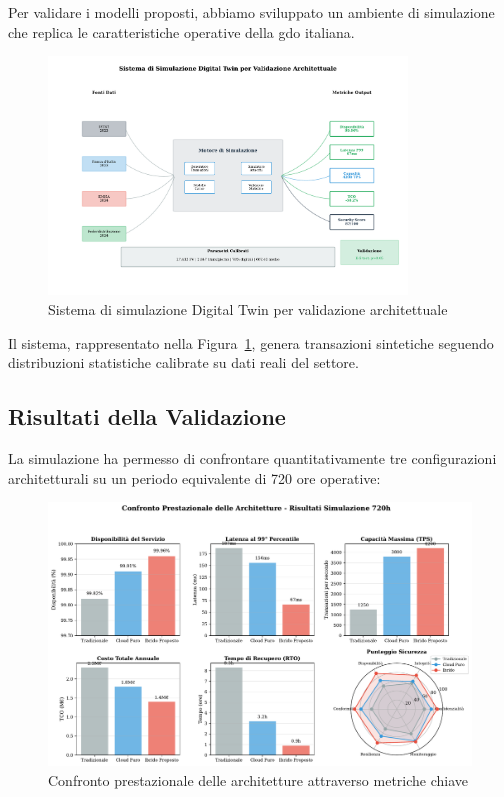 Per validare i modelli proposti, abbiamo sviluppato un ambiente di simulazione che replica le caratteristiche operative della \gls{gdo} italiana.

\begin{figure}[htbp]
\centering
\includegraphics[width=0.85\textwidth]{thesis_figures/cap4/fig_3_4_simulation_system.pdf}
\caption{Sistema di simulazione Digital Twin per validazione architettuale}
\label{fig:simulation-system}
\end{figure}

Il sistema, rappresentato nella Figura~\ref{fig:simulation-system}, genera transazioni sintetiche seguendo distribuzioni statistiche calibrate su dati reali del settore\autocite{federdistribuzione2024}.

\subsection{\texorpdfstring{Risultati della Validazione}{3.3.2 - Risultati della Validazione}}
\label{subsec:risultati-validazione}

La simulazione ha permesso di confrontare quantitativamente tre configurazioni architetturali su un periodo equivalente di 720 ore operative:

\begin{figure}[htbp]
\centering
\includegraphics[width=\textwidth]{thesis_figures/cap4/fig_3_6_performance_comparison.pdf}
\caption{Confronto prestazionale delle architetture attraverso metriche chiave}
\label{fig:performance-comparison}
\end{figure}

